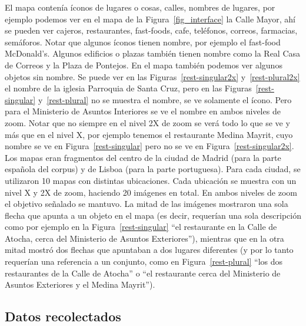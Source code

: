 El mapa conten\'ia \'iconos de lugares o cosas, calles, nombres de lugares, por ejemplo podemos ver en el mapa de la Figura~\ref{fig_interface} la Calle Mayor, ah\'i se pueden ver cajeros, restaurantes, fast-foods, cafe, tel\'efonos, correos, farmacias, sem\'aforos. Notar que algunos \'iconos tienen nombre, por ejemplo el fast-food McDonald's. Algunos edificios o plazas tambi\'en tienen nombre como la Real Casa de Correos y la Plaza de Pontejos. En el mapa tambi\'en podemos ver algunos objetos sin nombre.
Se puede ver en las Figuras~\ref{rest-singular2x} y~\ref{rest-plural2x}  el nombre de la iglesia Parroquia de Santa Cruz, pero en las Figuras~\ref{rest-singular} y~\ref{rest-plural} no se muestra el nombre, se ve solamente el \'icono. Pero para el Ministerio de Asuntos Interiores se ve el nombre en ambos niveles de zoom. Notar que no siempre en el nivel 2X de zoom se ver\'a todo lo que se ve y m\'as que en el nivel X, por ejemplo tenemos el restaurante Medina Mayrit, cuyo nombre se ve en Figura~\ref{rest-singular} pero no se ve en Figura~\ref{rest-singular2x}. 
Los mapas eran fragmentos del centro de la ciudad de Madrid (para la parte espa\~nola del corpus) y de Lisboa (para la parte portuguesa).
Para cada ciudad, se utilizaron 10 mapas con distintas ubicaciones. Cada ubicaci\'on se muestra con un nivel X y 2X de zoom, haciendo 20 im\'agenes en total. En ambos niveles de zoom el objetivo se\~{n}alado se mantuvo.%
La mitad de las im\'agenes mostraron una sola flecha que apunta a un objeto en el mapa (es decir, requer\'{i}an una sola descripci\'on como por ejemplo en la Figura~\ref{rest-singular} ``el restaurante en la Calle de Atocha, cerca del Ministerio de Asuntos Exteriores''), mientras que en la otra mitad mostr\'o dos flechas que apuntaban a dos lugares diferentes (y por lo tanto requer\'ian una referencia a un conjunto, como en Figura~\ref{rest-plural} ``los dos restaurantes de la Calle de Atocha'' o ``el restaurante cerca del Ministerio de Asuntos Exteriores y el Medina Mayrit'').


\subsection{Datos recolectados}
\label{sec:datos_recolectados}

